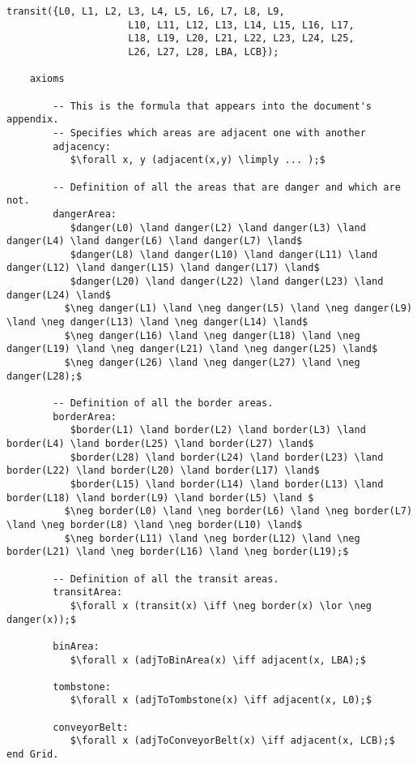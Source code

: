 \begin{lstlisting}[fontadjust, mathescape, frame=single]
            transit({L0, L1, L2, L3, L4, L5, L6, L7, L8, L9,
                     L10, L11, L12, L13, L14, L15, L16, L17,
                     L18, L19, L20, L21, L22, L23, L24, L25,
                     L26, L27, L28, LBA, LCB});

    axioms
        
        -- This is the formula that appears into the document's appendix.
        -- Specifies which areas are adjacent one with another
        adjacency:
           $\forall x, y (adjacent(x,y) \limply ... );$
        
        -- Definition of all the areas that are danger and which are not.
        dangerArea:
           $danger(L0) \land danger(L2) \land danger(L3) \land danger(L4) \land danger(L6) \land danger(L7) \land$
           $danger(L8) \land danger(L10) \land danger(L11) \land danger(L12) \land danger(L15) \land danger(L17) \land$
           $danger(L20) \land danger(L22) \land danger(L23) \land danger(L24) \land$
          $\neg danger(L1) \land \neg danger(L5) \land \neg danger(L9) \land \neg danger(L13) \land \neg danger(L14) \land$
          $\neg danger(L16) \land \neg danger(L18) \land \neg danger(L19) \land \neg danger(L21) \land \neg danger(L25) \land$
          $\neg danger(L26) \land \neg danger(L27) \land \neg danger(L28);$
        
        -- Definition of all the border areas.
        borderArea:
           $border(L1) \land border(L2) \land border(L3) \land border(L4) \land border(L25) \land border(L27) \land$
           $border(L28) \land border(L24) \land border(L23) \land border(L22) \land border(L20) \land border(L17) \land$
           $border(L15) \land border(L14) \land border(L13) \land border(L18) \land border(L9) \land border(L5) \land $
          $\neg border(L0) \land \neg border(L6) \land \neg border(L7) \land \neg border(L8) \land \neg border(L10) \land$
          $\neg border(L11) \land \neg border(L12) \land \neg border(L21) \land \neg border(L16) \land \neg border(L19);$

        -- Definition of all the transit areas.
        transitArea:
           $\forall x (transit(x) \iff \neg border(x) \lor \neg danger(x));$

        binArea:
           $\forall x (adjToBinArea(x) \iff adjacent(x, LBA);$

        tombstone:
           $\forall x (adjToTombstone(x) \iff adjacent(x, L0);$

        conveyorBelt:
           $\forall x (adjToConveyorBelt(x) \iff adjacent(x, LCB);$
end Grid.
\end{lstlisting}